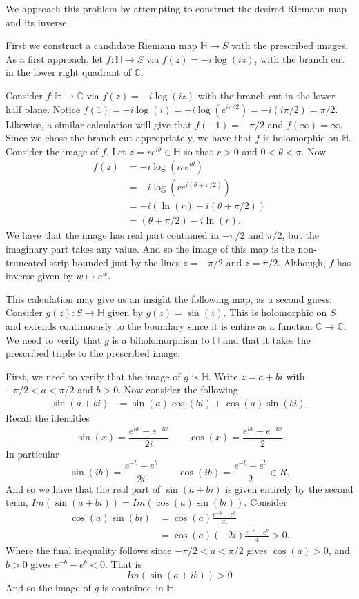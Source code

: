 \documentclass[12pt,letterpaper,boxed]{hmcpset}
\newcommand{\C}{\mathbb C}
\renewcommand{\H}{\mathbb H}
\begin{document}
\begin{solution}
We approach this problem by attempting to construct the desired
Riemann map and its inverse. 


First we construct a candidate Riemann map $\H \to S$ with the
prescribed images.
As a first approach,
let $f: \H \to S$ via $f(z) = -i\log(iz)$, with the branch cut in the
lower right quadrant of $\C$.

Consider $f: \H \to \C$ via $f(z) = -i\log(iz)$
with the branch cut in the lower half plane.
Notice $f(1) = -i\log(i) = -i\log(e^{i\pi/2}) = -i(i\pi/2) =
\pi/2$. Likewise, a similar calculation will give that $f(-1) =
-\pi/2$ and $f(\infty) = \infty$. 
Since we chose the branch cut appropriately, we have that $f$ is
holomorphic on $\H$. Consider the image of $f$. 
Let $z = re^{i\theta} \in \H$ so that $r > 0$ and $0 < \theta < \pi$. 
Now
\begin{align*}
	f(z) &= -i \log(i re^{i\theta}) \\ 
	&= -i \log(r e^{i(\theta + \pi/2)}) \\
	&= -i(\ln(r) + i(\theta + \pi/2)) \\ 
	&=  (\theta + \pi/2) - i \ln(r).
\end{align*}
We have that the image has real part contained in $-\pi/2$ and
$\pi/2$, but the imaginary part takes any value. And so the image of
this map is the non-truncated strip bounded just by the lines $z =
-\pi/2$ and $z = \pi/2$.
Although, $f$ has inverse given by $w \mapsto e^w$.

This calculation may give us an insight the following map, as a second
guess. 
Consider $g(z) : S \to \H$ given by $g(z) = \sin(z)$.
This is holomorphic on $S$ and extends continuously to the boundary since it is
entire as a function $\C \to \C$. 
We need to verify that $g$ is a biholomorphism to $\H$ and that it
takes the prescribed triple to the prescribed image. 

First, we need to verify that the image of $g$ is $\H$. 
Write $z = a + bi$ with $-\pi/2 < a < \pi/2$ and $b > 0$. 
Now consider the following
\begin{align*}
	\sin(a + bi) &= \sin(a)\cos(bi) + \cos(a)\sin(bi).
\end{align*}
Recall the identities
\[
	\sin(x) = \frac{e^{ix} - e^{-ix}}{2i} \qquad \cos(x) = \frac{e^{ix} + e^{-ix}}{2} 
\]
In particular 
\[
	\sin(ib) = \frac{e^{-b} - e^{b}}{2i} \qquad \cos(ib) = \frac{e^{-b} + e^{b}}{2} \in R.
\]
And so we have that the real part of $\sin(a+bi)$ is given entirely by
the second term, 
$Im(\sin(a+bi)) = Im(\cos(a)\sin(bi))$. 
Consider 
\begin{align*}
	\cos(a)\sin(bi) 
	&= \cos(a) \frac{e^{-b} - e^{b}}{2i} \\
	&= \cos(a) (-2i) \frac{e^{-b} - e^{b}}{4} > 0.
\end{align*}
Where the final inequality follows
since $-\pi/2 < a < \pi/2$ gives $\cos(a) > 0$, and $b >
0$ gives $e^{-b} - e^{b} < 0$.
That is \[
	Im(\sin(a+ib)) > 0
\]
And so the image of $g$ is contained in $\H$.


\end{solution}
\end{document}
